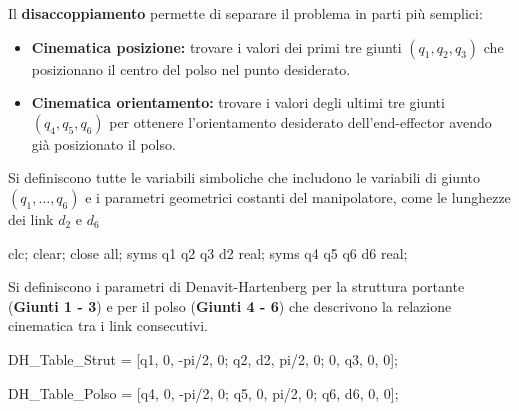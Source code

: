 \documentclass[11pt, a4paper]{article}
\begin{document}

\begin{par}
\begin{flushleft}
Il \textbf{disaccoppiamento} permette di separare il problema in parti più semplici:
\end{flushleft}
\end{par}

\begin{itemize}

   \item{\begin{flushleft} \textbf{Cinematica posizione:} trovare i valori dei primi tre giunti $(q_1 ,q_2 ,q_3 )$ che posizionano il centro del polso nel punto desiderato. \end{flushleft}}
   \item{\begin{flushleft} \textbf{Cinematica orientamento:} trovare i valori degli ultimi tre giunti $(q_4 ,q_5 ,q_6 )$ per ottenere l'orientamento desiderato dell'end-effector avendo già posizionato il polso. \end{flushleft}}
\end{itemize}

\begin{par}
\begin{flushleft}
Si definiscono tutte le variabili simboliche che includono le variabili di giunto $(q_1 ,\ldots,q_6 )$ e i parametri geometrici costanti del manipolatore, come le lunghezze dei link $d_2$ e $d_6$
\end{flushleft}
\end{par}

\begin{matlabcode}
clc; clear; close all;
syms q1 q2 q3 d2 real;
syms q4 q5 q6 d6 real;
\end{matlabcode}

\begin{par}
\begin{flushleft}
Si definiscono i parametri di Denavit-Hartenberg per la struttura portante (\textbf{Giunti 1 - 3}) e per il polso (\textbf{Giunti 4 - 6}) che descrivono la relazione cinematica tra i link consecutivi.
\end{flushleft}
\end{par}

\begin{matlabcode}
DH_Table_Strut = [q1, 0, -pi/2, 0;
                  q2, d2, pi/2, 0;
                  0, q3, 0, 0];

DH_Table_Polso = [q4, 0, -pi/2, 0;
                  q5, 0, pi/2, 0;
                  q6, d6, 0, 0];
\end{matlabcode}
\end{document}
